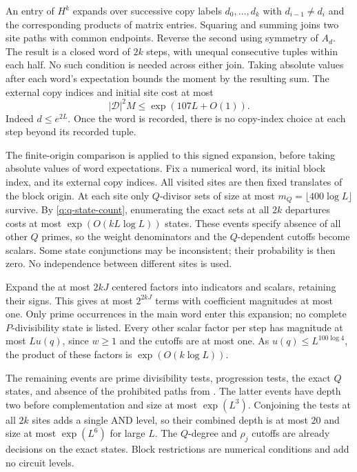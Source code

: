 An entry of $H^k$ expands over successive copy labels
$d_0,\ldots,d_k$ with $d_{i-1}\ne d_i$ and the corresponding products
of matrix entries.  Squaring and summing joins two site paths with
common endpoints.  Reverse the second using symmetry of $A_d$.
The result is a closed word of $2k$ steps, with unequal consecutive
tuples within each half.  No such condition is needed across either
join.  Taking absolute values after each word's expectation bounds
the moment by the resulting sum.  The external copy indices and initial
site cost at most
\begin{equation}\label{q:external-dimension}
 |\mathcal D|^2M\le\exp(107L+O(1)).
\end{equation}
Indeed $d\le e^{2L}$.  Once the word is recorded, there is no copy-index
choice at each step beyond its recorded tuple.

The finite-origin comparison is applied to this signed expansion,
before taking absolute values of word expectations. Fix a numerical
word, its initial block index, and its external copy indices. All
visited sites are then fixed translates of the block origin. At each
site only $Q$-divisor sets of size at most $m_Q=\lfloor400\log L\rfloor$
survive. By \eqref{q:q-state-count}, enumerating the exact sets at all
$2k$ departures costs at most $\exp(O(kL\log L))$ states. These events
specify absence of all other $Q$ primes, so the weight denominators and
the $Q$-dependent cutoffs become scalars. Some state conjunctions may
be inconsistent; their probability is then zero. No independence
between different sites is used.

Expand the at most $2kJ$ centered factors into indicators and scalars,
retaining their signs. This gives at most $2^{2kJ}$ terms with
coefficient magnitudes at most one. Only prime occurrences in the main
word enter this expansion; no complete $P$-divisibility state is listed.
Every other scalar factor per step has magnitude at most $Lu(q)$,
since $w\ge1$ and the cutoffs are at most one. As
$u(q)\le L^{100\log4}$, the product of these factors is
$\exp(O(k\log L))$.

The remaining events are prime divisibility tests, progression tests,
the exact $Q$ states, and absence of the prohibited paths from
. The latter events have depth two before complementation
and size at most $\exp(L^3)$. Conjoining the tests at all $2k$ sites
adds a single AND level, so their combined depth is at most $20$ and
size at most $\exp(L^6)$ for large $L$. The $Q$-degree and
$\rho_j$ cutoffs are already decisions on the exact states. Block
restrictions are numerical conditions and add no circuit levels.


